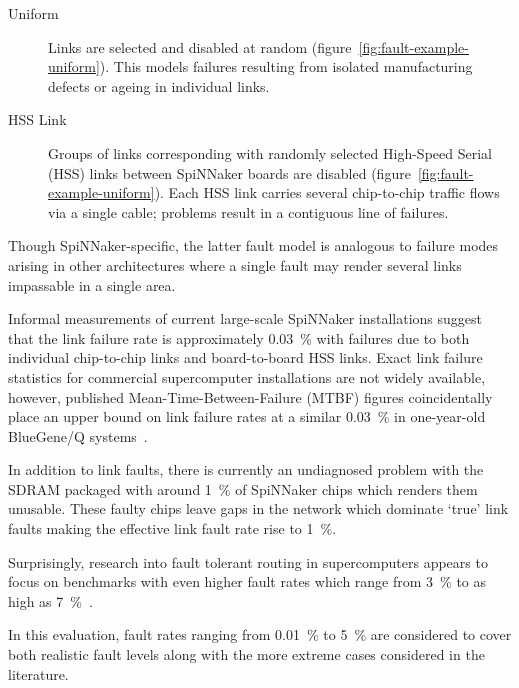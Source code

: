 			\begin{description}
				
				\item[Uniform] Links are selected and disabled at random
				(figure~\ref{fig:fault-example-uniform}). This models failures
				resulting from isolated manufacturing defects or ageing in individual
				links.
				
				\item[HSS Link] Groups of links corresponding with randomly selected
				High-Speed Serial (HSS) links between SpiNNaker boards are disabled
				(figure~\ref{fig:fault-example-uniform}). Each HSS link carries several
				chip-to-chip traffic flows via a single cable; problems result in a
				contiguous line of failures.
				
			\end{description}
			
			Though SpiNNaker-specific, the latter fault model is analogous to failure
			modes arising in other architectures where a single fault may render
			several links impassable in a single area.
			
			Informal measurements of current large-scale SpiNNaker installations
			suggest that the link failure rate is approximately \SI{0.03}{\percent}
			with failures due to both individual chip-to-chip links and
			board-to-board HSS links. Exact link failure statistics for commercial
			supercomputer installations are not widely available, however, published
			Mean-Time-Between-Failure (MTBF) figures coincidentally place an upper
			bound on link failure rates at a similar \SI{0.03}{\percent} in
			one-year-old BlueGene/Q systems~\cite{chiu11}.
			
			In addition to link faults, there is currently an undiagnosed problem
			with the SDRAM packaged with around \SI{1}{\percent} of SpiNNaker chips
			which renders them unusable. These faulty chips leave gaps in the network
			which dominate `true' link faults making the effective link fault rate
			rise to \SI{1}{\percent}.
			
			Surprisingly, research into fault tolerant routing in supercomputers
			appears to focus on benchmarks with even higher fault rates which range
			from \SI{3}{\percent} to as high as
			\SI{7}{\percent}~\cite{ho04,gomez04,mejia06}.
			
			In this evaluation, fault rates ranging from \SI{0.01}{\percent} to
			\SI{5}{\percent} are considered to cover both realistic fault levels
			along with the more extreme cases considered in the literature.
		
